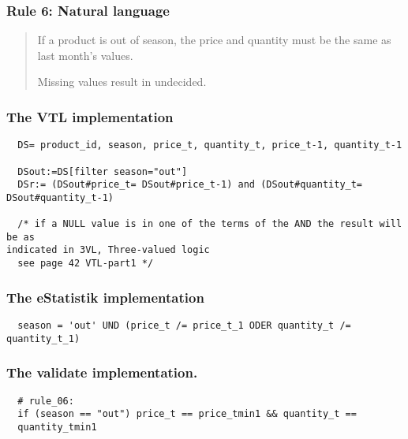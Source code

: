 \newpage

\subsubsection*{  Rule 6: Natural language}
\begin{quote}


If a product is out of season, the price and quantity must be the same as last month's values.

Missing values result in undecided.


\end{quote}
\subsubsection*{The VTL implementation}
\begin{verbatim}
  DS= product_id, season, price_t, quantity_t, price_t-1, quantity_t-1

  DSout:=DS[filter season="out"]
  DSr:= (DSout#price_t= DSout#price_t-1) and (DSout#quantity_t=
DSout#quantity_t-1)

  /* if a NULL value is in one of the terms of the AND the result will be as
indicated in 3VL, Three-valued logic
  see page 42 VTL-part1 */
\end{verbatim}
\subsubsection*{The eStatistik implementation}
\begin{verbatim}
  season = 'out' UND (price_t /= price_t_1 ODER quantity_t /= quantity_t_1)
\end{verbatim}
\subsubsection*{The validate implementation.}
\begin{verbatim}
  # rule_06:
  if (season == "out") price_t == price_tmin1 && quantity_t ==
  quantity_tmin1
\end{verbatim}


\newpage

